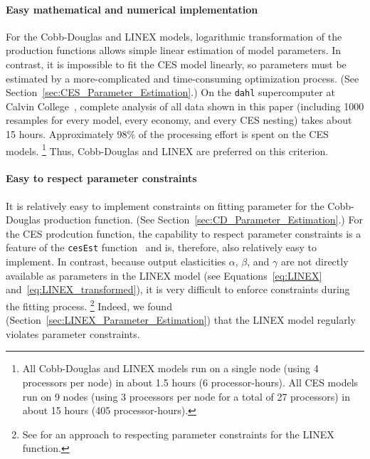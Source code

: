 \documentclass[preprint,authoryear,12pt]{elsarticle}\usepackage[]{graphicx}\usepackage[]{color}
\begin{document}
\paragraph{Easy mathematical and numerical implementation} 
\label{sec:easy_implementation}

For the Cobb-Douglas and LINEX models, 
logarithmic transformation of the production functions 
allows simple linear estimation of model parameters.
In contrast, it is impossible to fit the CES model linearly,
so parameters must be estimated by a more-complicated and time-consuming optimization process.
(See Section~\ref{sec:CES_Parameter_Estimation}.)
On the \texttt{dahl} supercomputer at Calvin College~\citep{Adams:2008aa},
complete analysis of all data shown in this paper
(including 1000 resamples for every model, every economy, and every CES nesting)
takes about 15 hours.
Approximately 98\% of the processing effort is spent on the CES models.%
  \footnote{
  All Cobb-Douglas and LINEX models run on a single node (using 4 processors per node) 
  in about 1.5 hours (6 processor-hours).
  All CES models run on 9 nodes (using 3 processors per node for a total of 27 processors) 
  in about 15 hours (405 processor-hours).
  }
Thus, Cobb-Douglas and LINEX are preferred on this criterion.


\paragraph{Easy to respect parameter constraints} 
\label{sec:easy_constraints}

It is relatively easy to implement constraints on fitting parameter 
for the Cobb-Douglas production function. (See Section~\ref{sec:CD_Parameter_Estimation}.)
For the CES prodcution function, 
the capability to respect parameter constraints is a feature of the 
\texttt{cesEst} function~\citep{Henningsen:2011td} and is, therefore,
also relatively easy to implement.
In contrast, because output elasticities $\alpha$, $\beta$, and $\gamma$ 
are not directly available as parameters in the LINEX model
(see Equations~\ref{eq:LINEX} and~\ref{eq:LINEX_transformed}),
it is very difficult to enforce constraints during the fitting process.%
  \footnote{
  See \citet{Kummel:2011aa} for an approach to respecting parameter constraints 
  for the LINEX function. 
  }
Indeed, we found (Section~\ref{sec:LINEX_Parameter_Estimation})
that the LINEX model regularly violates parameter constraints.
\end{document}
